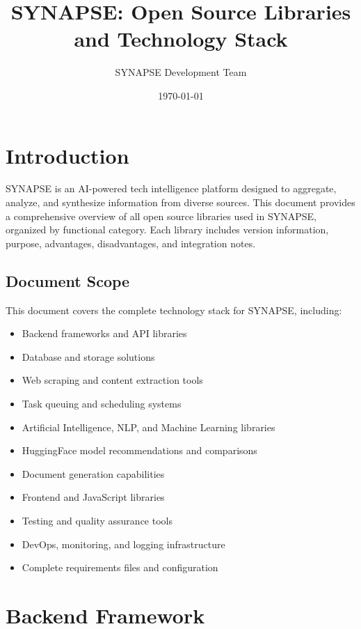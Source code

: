 \documentclass[12pt,a4paper]{report}
\title{SYNAPSE: Open Source Libraries and Technology Stack}
\author{SYNAPSE Development Team}
\date{\today}
\begin{document}
\maketitle

\tableofcontents

\chapter{Introduction}

SYNAPSE is an AI-powered tech intelligence platform designed to aggregate, analyze, and synthesize information from diverse sources. This document provides a comprehensive overview of all open source libraries used in SYNAPSE, organized by functional category. Each library includes version information, purpose, advantages, disadvantages, and integration notes.

\section{Document Scope}

This document covers the complete technology stack for SYNAPSE, including:

\begin{itemize}
    \item Backend frameworks and API libraries
    \item Database and storage solutions
    \item Web scraping and content extraction tools
    \item Task queuing and scheduling systems
    \item Artificial Intelligence, NLP, and Machine Learning libraries
    \item HuggingFace model recommendations and comparisons
    \item Document generation capabilities
    \item Frontend and JavaScript libraries
    \item Testing and quality assurance tools
    \item DevOps, monitoring, and logging infrastructure
    \item Complete requirements files and configuration
\end{itemize}

\chapter{Backend Framework}
\end{document}
